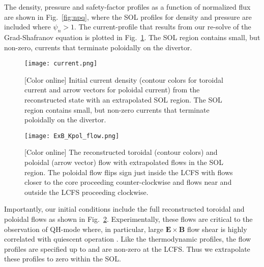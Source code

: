 The density, pressure and safety-factor profiles as a function of normalized
flux are shown in Fig.~\ref{fig:npq}, where the SOL profiles for density and
pressure are included where $\psi_n>1$. The current-profile that results
from our re-solve of the Grad-Shafranov equation is plotted in Fig.~\ref{fig:current}.
The SOL region contains small, but non-zero, currents that terminate
poloidally on the divertor.

\begin{figure}
  \centering
  \texttt{[image: current.png]}
  \vspace{-4mm}
  \caption{[Color online]
  Initial current density (contour colors for toroidal current and arrow
  vectors for poloidal current) from the reconstructed state with an extrapolated SOL
  region. The SOL region contains small, but non-zero currents that
  terminate poloidally on the divertor. }
  \label{fig:current}
\end{figure}

\begin{figure}
  \centering
  \texttt{[image: ExB\_Kpol\_flow.png]}
  \vspace{-4mm}
  \caption{[Color online]
  The reconstructed toroidal (contour colors) and poloidal (arrow vector) flow with
  extrapolated flows in the SOL region. The poloidal flow flips sign just inside
  the LCFS with flows closer to the core proceeding counter-clockwise and flows
  near and outside the LCFS proceeding clockwise. }
  \label{fig:flows}
\end{figure}

Importantly, our initial conditions include the full reconstructed
toroidal and poloidal flows as shown in Fig.~\ref{fig:flows}.
Experimentally, these flows are critical to the observation of QH-mode where,
in particular, large $\mathbf{E}\times\mathbf{B}$ flow shear is highly correlated with quiescent
operation \cite{garofalo11}. 
Like the thermodynamic profiles, the flow profiles are specified up to and
are non-zero at the LCFS. Thus we extrapolate these profiles to zero within the
SOL.

